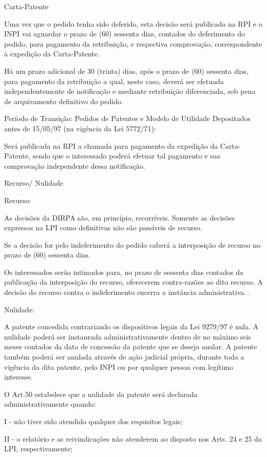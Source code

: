 \documentclass[12pt]{article}
\begin{document}
 Carta-Patente
 
 Uma vez que o pedido tenha sido deferido, esta decisão será publicada
 na RPI e o INPI vai aguardar o prazo de (60) sessenta dias, contados
 do deferimento do pedido, para pagamento da retribuição, e respectiva
 comprovação, correspondente à expedição da Carta-Patente.
 
 Há um prazo adicional de 30 (trinta) dias, após o prazo de (60)
 sessenta dias, para pagamento da retribuição a qual, neste caso,
 deverá ser efetuada independentemente de notificação e mediante
 retribuição diferenciada, sob pena de arquivamento definitivo do
 pedido.
 
 Período de Transição: Pedidos de Patentes e Modelo de Utilidade
 Depositados antes de 15/05/97 (na vigência da Lei 5772/71):
 
 Será publicada na RPI a chamada para pagamento da expedição da
 Carta-Patente, sendo que o interessado poderá efetuar tal pagamento e
 sua comprovação independente dessa notificação.


 Recurso/ Nulidade

 Recurso:
 
 As decisões da DIRPA são, em princípio, recorríveis. Somente as
 decisões expressas na LPI como definitivas não são passíveis de
 recurso.
 
 Se a decisão for pelo indeferimento do pedido caberá a interposição
 de recurso no prazo de (60) sessenta dias.
 
 Os interessados serão intimados para, no prazo de sessenta dias
 contados da publicação da interposição do recurso, oferecerem
 contra-razões ao dito recurso. A decisão do recurso contra o
 indeferimento encerra a instância administrativa. .

 Nulidade:
 
 A patente concedida contrariando os dispositivos legais da Lei
 9279/97 é nula. A nulidade poderá ser instaurada administrativamente
 dentro de no máximo seis meses contados da data de concessão da
 patente que se deseja anular. A patente também poderá ser anulada
 através de ação judicial própria, durante toda a vigência da dita
 patente, pelo INPI ou por qualquer pessoa com legítimo interesse.
 
 O Art.50 estabelece que a nulidade da patente será declarada
 administrativamente quando:
 
 I - não tiver sido atendido qualquer dos requisitos legais;
 
 II - o relatório e as reivindicações não atenderem ao disposto nos
 Arts. 24 e 25 da LPI, respectivamente;
 
\end{document}
